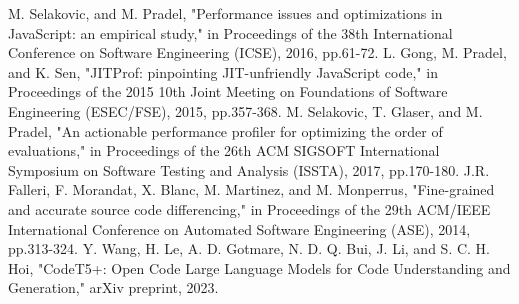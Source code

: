 \documentclass[T,J]{fose} %
\begin{document}
\begin{thebibliography}{9}
    M. Selakovic, and M. Pradel,
    "Performance issues and optimizations in JavaScript: an empirical study,"
    in Proceedings of the 38th International Conference on Software Engineering (ICSE),
    2016,
    pp.61-72.
    L. Gong, M. Pradel, and K. Sen,
    "JITProf: pinpointing JIT-unfriendly JavaScript code,"
    in Proceedings of the 2015 10th Joint Meeting on Foundations of Software Engineering (ESEC/FSE),
    2015,
    pp.357-368.
    M. Selakovic, T. Glaser, and M. Pradel,
    "An actionable performance profiler for optimizing the order of evaluations,"
    in Proceedings of the 26th ACM SIGSOFT International Symposium on Software Testing and Analysis (ISSTA),
    2017,
    pp.170-180.
    J.R. Falleri, F. Morandat, X. Blanc, M. Martinez, and M. Monperrus,
    "Fine-grained and accurate source code differencing,"
    in Proceedings of the 29th ACM/IEEE International Conference on Automated Software Engineering (ASE),
    2014,
    pp.313-324.
    Y. Wang, H. Le, A. D. Gotmare, N. D. Q. Bui, J. Li, and S. C. H. Hoi,
    "CodeT5+: Open Code Large Language Models for Code Understanding and Generation,"
    arXiv preprint,
    2023.
\end{thebibliography}

\end{document}
